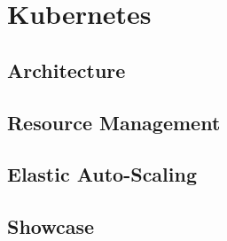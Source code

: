 \chapter{Kubernetes}
\label{chp:kubernetes}


\lipsum[1]


\section{Architecture}
\label{sec:kubernetes-architecture}

\lipsum[1]


\section{Resource Management}
\label{sec:kubernetes-resource-management}

\lipsum[1]


\section{Elastic Auto-Scaling}
\label{sec:kubernetes-elastic-autoscaling}

\lipsum[1]


\section{Showcase}
\label{sec:elasticity-showcase}

\lipsum[1]